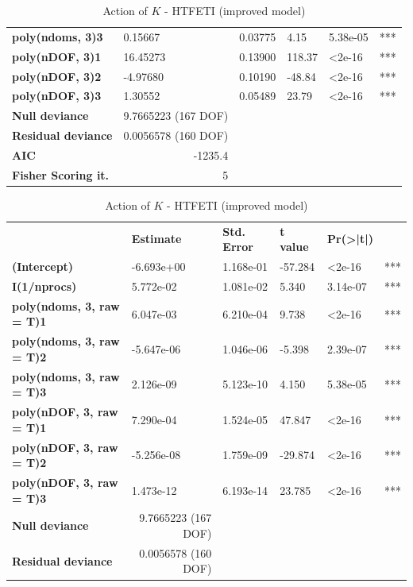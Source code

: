 \begin{table}[!hptb]
\begin{tabular}{llllll}
\textbf{poly(ndoms, 3)3} & 0.15667 & 0.03775 & 4.15 & 5.38e-05 & *** \\
\textbf{poly(nDOF, 3)1} & 16.45273 & 0.13900 & 118.37 & \textless 2e-16 & *** \\
\textbf{poly(nDOF, 3)2} & -4.97680 & 0.10190 & -48.84 & \textless 2e-16 & *** \\
\textbf{poly(nDOF, 3)3} & 1.30552 & 0.05489 & 23.79 & \textless 2e-16 & *** \\
\hhline{======}
\textbf{Null deviance} & \multicolumn{1}{r}{9.7665223  (167 DOF)} &  &  &  &  \\
\textbf{Residual deviance} & \multicolumn{1}{r}{0.0056578 (160 DOF)} &  &  &  &  \\
\textbf{AIC} & \multicolumn{1}{r}{-1235.4} &  &  &  &  \\
\textbf{Fisher Scoring it.} & \multicolumn{1}{r}{5} &  &  &  & 
\end{tabular}
\caption{Action of $K$ - HTFETI (improved model)}
\label{tab:actionKHTFETIimp}
\vspace{1.5em}
\scriptsize
\begin{tabular}{llllll}
\multicolumn{1}{c}{} & \textbf{Estimate} & \textbf{Std. Error} & \textbf{t value} & \textbf{Pr(\textgreater|t|)} & \multicolumn{1}{c}{} \\
\textbf{(Intercept)} & -6.693e+00 & 1.168e-01 & -57.284 & \textless 2e-16 & *** \\
\textbf{I(1/nprocs)} & 5.772e-02 & 1.081e-02 & 5.340 & 3.14e-07 & *** \\
\textbf{poly(ndoms, 3, raw = T)1} & 6.047e-03 & 6.210e-04 & 9.738 & \textless 2e-16 & *** \\
\textbf{poly(ndoms, 3, raw = T)2} & -5.647e-06 & 1.046e-06 & -5.398 & 2.39e-07 & *** \\
\textbf{poly(ndoms, 3, raw = T)3} & 2.126e-09 & 5.123e-10 & 4.150 & 5.38e-05 & *** \\
\textbf{poly(nDOF, 3, raw = T)1} & 7.290e-04 & 1.524e-05 & 47.847 & \textless 2e-16 & *** \\
\textbf{poly(nDOF, 3, raw = T)2} & -5.256e-08 & 1.759e-09 & -29.874 & \textless 2e-16 & *** \\
\textbf{poly(nDOF, 3, raw = T)3} & 1.473e-12 & 6.193e-14 & 23.785 & \textless 2e-16 & *** \\ \hhline{======}
\textbf{Null deviance} & \multicolumn{1}{r}{9.7665223 (167 DOF)} &  &  &  &  \\
\textbf{Residual deviance} & \multicolumn{1}{r}{0.0056578 (160 DOF)} &  &  &  &  \\

\end{tabular}
\end{table}

